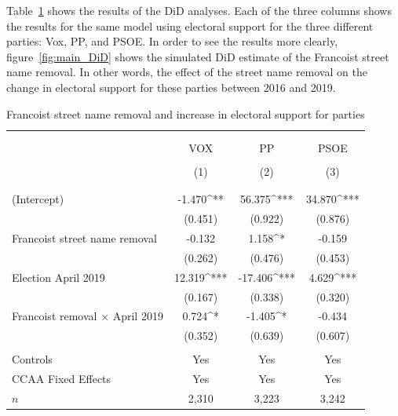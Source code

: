 \documentclass[12pt, notitlepage]{article}
\begin{document}
Table~\ref{tab:main_DiD} shows the results of the DiD analyses.
Each of the three columns shows the results for the same model using electoral support for the three different parties: Vox, PP, and PSOE.
In order to see the results more clearly, figure~\ref{fig:main_DiD} shows the simulated DiD estimate of the Francoist street name removal.
In other words, the effect of the street name removal on the change in electoral support for these parties between 2016 and 2019.

\begin{table}[!htbp] \centering
  \caption{Francoist street name removal and increase in electoral support for parties}
  \label{tab:main_DiD}

  \small
  \begin{tabular}{lccc}
  \\[-1.8ex]\hline
  \hline \\[-1.8ex]
  \\[-1.8ex] & \multicolumn{1}{c}{VOX} & \multicolumn{1}{c}{PP} & \multicolumn{1}{c}{PSOE} \\
  \\[-1.8ex] & \multicolumn{1}{c}{(1)} & \multicolumn{1}{c}{(2)} & \multicolumn{1}{c}{(3)}\\
  \\[-1.8ex]\hline
  \\[-1.8ex]
   (Intercept) & -1.470^{**} & 56.375^{***} & 34.870^{***} \\
    & (0.451) & (0.922) & (0.876) \\
    Francoist street name removal & -0.132 & 1.158^{*} & -0.159 \\
    & (0.262) & (0.476) & (0.453) \\
    Election April 2019 & 12.319^{***} & -17.406^{***} & 4.629^{***} \\
    & (0.167) & (0.338) & (0.320) \\
    Francoist removal $\times$ April 2019 & 0.724^{*} & -1.405^{*} & -0.434 \\
    & (0.352) & (0.639) & (0.607) \\
   \hline \\[-1.8ex]
  Controls & \multicolumn{1}{c}{Yes} & \multicolumn{1}{c}{Yes} & \multicolumn{1}{c}{Yes} \\
  CCAA Fixed Effects & \multicolumn{1}{c}{Yes} & \multicolumn{1}{c}{Yes} & \multicolumn{1}{c}{Yes} \\
  $n$ & \multicolumn{1}{c}{2,310} & \multicolumn{1}{c}{3,223} & \multicolumn{1}{c}{3,242} \\

\end{tabular}
\end{table}
\end{document}

